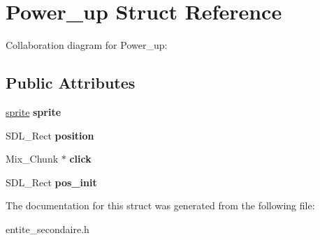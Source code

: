 \hypertarget{structPower__up}{}\section{Power\+\_\+up Struct Reference}
\label{structPower__up}


Collaboration diagram for Power\+\_\+up\+:
\subsection*{Public Attributes}
\begin{DoxyCompactItemize}
\item 
\mbox{\label{structPower__up_a76e1d05c017a2491cda4ac0d3014f0eb}} 
\hyperlink{structSprite}{sprite} {\bfseries sprite}
\item 
\mbox{\label{structPower__up_a7369bc0bc57931b751b8889641819c4d}} 
S\+D\+L\+\_\+\+Rect {\bfseries position}
\item 
\mbox{\label{structPower__up_ab062d39a523db0b01fd450575852b62b}} 
Mix\+\_\+\+Chunk $\ast$ {\bfseries click}
\item 
\mbox{\label{structPower__up_a928fc674bab68a3f650283e606ef16f2}} 
S\+D\+L\+\_\+\+Rect {\bfseries pos\+\_\+init}
\end{DoxyCompactItemize}


The documentation for this struct was generated from the following file\+:\begin{DoxyCompactItemize}
\item 
entite\+\_\+secondaire.\+h\end{DoxyCompactItemize}

